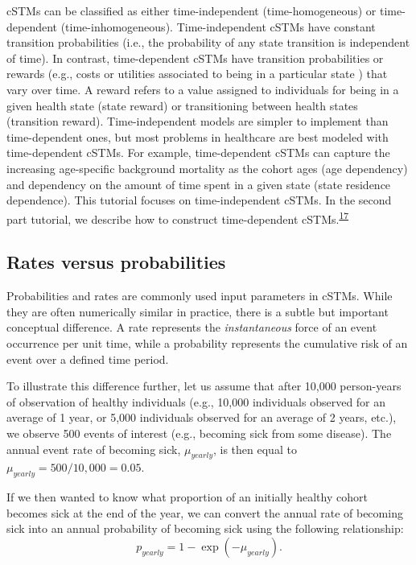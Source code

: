 \documentclass[
]{article}
\begin{document}
cSTMs can be classified as either time-independent (time-homogeneous) or time-dependent (time-inhomogeneous). Time-independent cSTMs have constant transition probabilities (i.e., the probability of any state transition is independent of time). In contrast, time-dependent cSTMs have transition probabilities or rewards (e.g., costs or utilities associated to being in a particular state ) that vary over time. A reward refers to a value assigned to individuals for being in a given health state (state reward) or transitioning between health states (transition reward). Time-independent models are simpler to implement than time-dependent ones, but most problems in healthcare are best modeled with time-dependent cSTMs. For example, time-dependent cSTMs can capture the increasing age-specific background mortality as the cohort ages (age dependency) and dependency on the amount of time spent in a given state (state residence dependence). This tutorial focuses on time-independent cSTMs. In the second part tutorial, we describe how to construct time-dependent cSTMs.\textsuperscript{\protect\hyperlink{ref-Alarid-Escudero2021b}{17}}

\hypertarget{rates-versus-probabilities}{%
\subsection{Rates versus probabilities}\label{rates-versus-probabilities}}

Probabilities and rates are commonly used input parameters in cSTMs. While they are often numerically similar in practice, there is a subtle but important conceptual difference. A rate represents the \textit{instantaneous} force of an event occurrence per unit time, while a probability represents the cumulative risk of an event over a defined time period.

To illustrate this difference further, let us assume that after 10,000 person-years of observation of healthy individuals (e.g., 10,000 individuals observed for an average of 1 year, or 5,000 individuals observed for an average of 2 years, etc.), we observe 500 events of interest (e.g., becoming sick from some disease). The annual event rate of becoming sick, \(\mu_{yearly}\), is then equal to \(\mu_{yearly}=500 / 10,000=0.05\).

If we then wanted to know what proportion of an initially healthy cohort becomes sick at the end of the year, we can convert the annual rate of becoming sick into an annual probability of becoming sick using the following relationship:
\begin{equation}
    p_{yearly} = 1-\exp{\left(-\mu_{yearly} \right)}.
    \label{eq:rate-to-prob-ann}
\end{equation}
\end{document}
